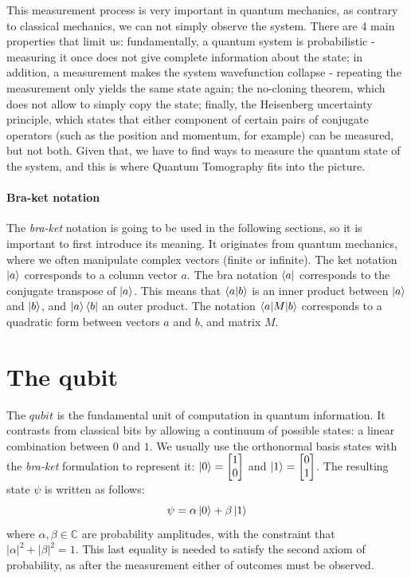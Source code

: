 \documentclass[12pt]{memoir}
\begin{document}
This measurement process is very important in quantum mechanics, as contrary to classical mechanics, we can not simply observe the system. There are 4 main properties that limit us: fundamentally, a quantum system is probabilistic - measuring it once does not give complete information about the state; in addition, a measurement makes the system wavefunction collapse - repeating the measurement only yields the same state again; the no-cloning theorem, which does not allow to simply copy the state; finally, the Heisenberg uncertainty principle, which states that either component of certain pairs of conjugate operators (such as the position and momentum, for example) can be measured, but not both. Given that, we have to find ways to measure the quantum state of the system, and this is where Quantum Tomography fits into the picture.

\paragraph*{Bra-ket notation}
The \textit{bra-ket} notation is going to be used in the following sections, so it is important to first introduce its meaning. It originates from quantum mechanics, where we often manipulate complex vectors (finite or infinite). The ket notation $\ket a$ corresponds to a column vector $a$. The
bra notation $\bra a$ corresponds to the conjugate transpose of $\ket a$. This means that $\braket{a|b}$ is an inner product between $\ket a$ and $\ket b$, and $\ket a \bra b$ an outer product. The notation $\braket{a|M|b}$ corresponds to a quadratic form between vectors $a$ and $b$, and matrix $M$.\medbreak 

\section{The qubit}\label{section:qubit}
The $qubit$ is the fundamental unit of computation in quantum information. It contrasts from classical bits by allowing a continuum of possible states: a linear combination between $0$ and $1$. We usually use the orthonormal basis states with the \textit{bra-ket} formulation to represent it: $\ket 0 = \begin{bmatrix}
    1\\
    0
\end{bmatrix}$ and $\ket 1 = \begin{bmatrix}
    0\\
    1
\end{bmatrix}$. The resulting state $\psi$ is written as follows:
\begin{equation}
    \psi = \alpha \ket 0 + \beta \ket 1 
\end{equation}
where $\alpha,\beta \in \mathbb{C}$ are probability amplitudes, with the constraint that $|\alpha|^2 + |\beta|^2 = 1$. This last equality is needed to satisfy the second axiom of probability, as after the measurement either of outcomes must be observed.\medbreak
\end{document}
